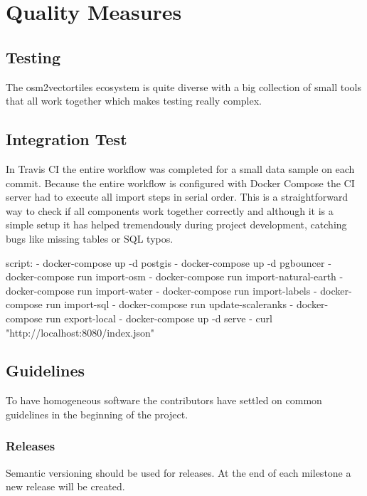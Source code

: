 \chapter{Quality Measures}\label{quality-measures}

\section{Testing}\label{testing}

The osm2vectortiles ecosystem is quite diverse with a big collection of small tools that all work together which makes testing really complex.

\section{Integration Test}

In Travis CI\cite{pm_5_travis-ci.org_2015}  the entire workflow was completed for a small data sample on each commit.
Because the entire workflow is configured with Docker Compose \cite{pm_6_docs.docker.com_2015} the CI server had to execute all import steps in serial order. This is a straightforward way to check if all components work together correctly
and although it is a simple setup it has helped tremendously during project development, catching bugs
like missing tables or SQL typos.

\begin{yamlcode}
script:
  - docker-compose up -d postgis
  - docker-compose up -d pgbouncer
  - docker-compose run import-osm
  - docker-compose run import-natural-earth
  - docker-compose run import-water
  - docker-compose run import-labels
  - docker-compose run import-sql
  - docker-compose run update-scaleranks
  - docker-compose run export-local
  - docker-compose up -d serve
  - curl "http://localhost:8080/index.json"
\end{yamlcode}

\section{Guidelines}\label{guidelines}
To have homogeneous software the contributors have settled on common guidelines in the beginning of the project.

\subsection{Releases}
Semantic versioning \cite{pm_7_preston-werner_2015} should be used for releases.
At the end of each milestone a new release will be created.
\newpage

